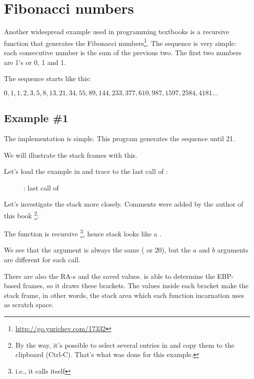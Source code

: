 \section{Fibonacci numbers}

Another widespread example used in programming textbooks is a recursive function 
that generates the Fibonacci numbers\footnote{\url{http://go.yurichev.com/17332}}.
The sequence is very simple: each consecutive number is the sum of the previous two.
The first two numbers are 1's or 0, 1 and 1.

The sequence starts like this:

\begin{center}
$0, 1, 1, 2, 3, 5, 8, 13, 21, 34, 55, 89, 144, 233, 377, 610, 987, 1597, 2584, 4181 ...$
\end{center}

\subsection{Example \#1}

The implementation is simple. This program generates the sequence until 21.





We will illustrate the stack frames with this.

\clearpage

Let's load the example in \olly and trace to the last call of \ttf{}:

\begin{figure}[H]
\centering
{}
\caption{\olly: last call of \ttf{}}
\label{fig:fib_olly}
\end{figure}

\clearpage
Let's investigate the stack more closely. 
Comments were added by the author of this book
\footnote{By the way, it's possible to select several entries in \olly and copy them to the clipboard (Ctrl-C).
That's what was done for this example.}:



The function is recursive \footnote{i.e., it calls itself}, hence stack looks like a .

We see that the  argument is always the same ( or 20), but the $a$ and $b$ arguments are different for each call.

There are also the \ac{RA}-s and the saved \EBP values.
\olly is able to determine the EBP-based frames, so it draws these brackets.
The values inside each bracket make the \gls{stack frame}, 
in other words, the stack area which each function incarnation uses as scratch space. 

